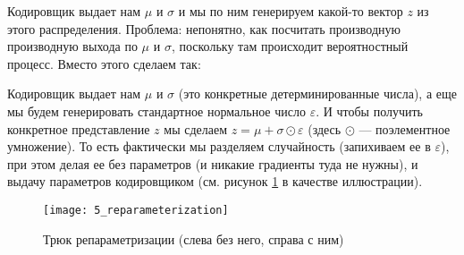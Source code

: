 Кодировщик выдает нам $\mu$ и $\sigma$ и мы по ним генерируем какой-то вектор $z$ из этого распределения. Проблема: непонятно, как посчитать производную производную выхода по $\mu$ и $\sigma$, поскольку там происходит вероятностный процесс. Вместо этого сделаем так:

Кодировщик выдает нам $\mu$ и $\sigma$ (это конкретные детерминированные числа), а еще мы будем генерировать стандартное нормальное число $\varepsilon$. И чтобы получить конкретное представление $z$ мы сделаем $z = \mu + \sigma \odot \varepsilon$ (здесь $\odot$ --- поэлементное умножение). То есть фактически мы разделяем случайность (запихиваем ее в $\varepsilon$), при этом делая ее без параметров (и никакие градиенты туда не нужны), и выдачу параметров кодировщиком (см. рисунок \ref{fig:5_reparameterization} в качестве иллюстрации).

\begin{figure}[H]
	\centering
	\texttt{[image: 5\_reparameterization]}
	\caption{Трюк репараметризации (слева без него, справа с ним)}
	\label{fig:5_reparameterization}
\end{figure}